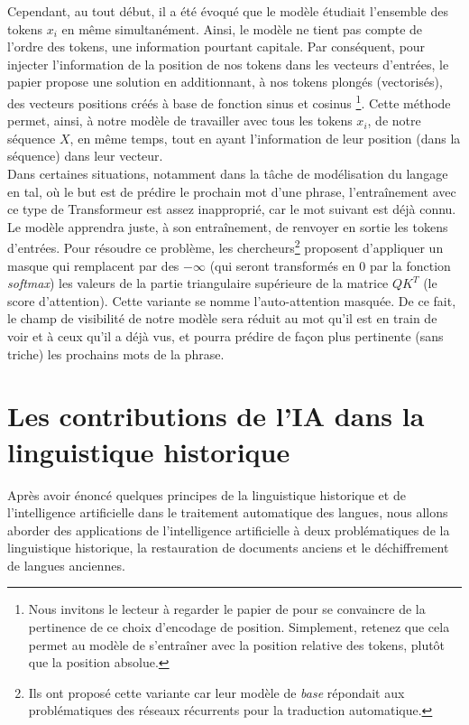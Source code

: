 \documentclass[12pt, twoside]{report}
\begin{document}
Cependant, au tout début, il a été évoqué que le modèle étudiait l'ensemble des tokens $x_i$ en même simultanément. Ainsi, le modèle ne tient pas compte de l'ordre des tokens, une information pourtant capitale. Par conséquent, pour injecter l'information de la position de nos tokens dans les vecteurs d'entrées, le papier \cite{transformer} propose une solution en additionnant, à nos tokens plongés (vectorisés), des vecteurs positions créés à base de fonction sinus et cosinus \footnote{Nous invitons le lecteur à regarder le papier de \autocite{transformer} pour se convaincre de la pertinence de ce choix d'encodage de position. Simplement, retenez que cela permet au modèle de s'entraîner avec la position relative des tokens, plutôt que la position absolue.}. Cette méthode permet, ainsi, à notre modèle de travailler avec tous les tokens $x_i$, de notre séquence $X$, en même temps, tout en ayant l'information de leur position (dans la séquence) dans leur vecteur.\\

Dans certaines situations, notamment dans la tâche de modélisation du langage en \Gls{tal}, où le but est de prédire le prochain mot d'une phrase, l'entraînement avec ce type de Transformeur est assez inapproprié, car le mot suivant est déjà connu. Le modèle apprendra juste, à son entraînement, de renvoyer en sortie les tokens d'entrées. Pour résoudre ce problème, les chercheurs\footnote{Ils ont proposé cette variante car leur modèle de \textit{base} répondait aux problématiques des réseaux récurrents pour la traduction automatique.} proposent d'appliquer un masque qui remplacent par des $-\infty$ (qui seront transformés en 0 par la fonction \textit{softmax}) les valeurs de la partie triangulaire supérieure de la matrice $QK^T$ (le score d'attention). Cette variante se nomme l'auto-attention masquée. De ce fait, le champ de visibilité de notre modèle sera réduit au mot qu'il est en train de voir et à ceux qu'il a déjà vus, et pourra prédire de façon plus pertinente (sans triche) les prochains mots de la phrase.

\chapter{Les contributions de l'IA dans la linguistique historique}

Après avoir énoncé quelques principes de la linguistique historique et de l'intelligence artificielle dans le traitement automatique des langues, nous allons aborder des applications de l'intelligence artificielle à deux problématiques de la linguistique historique, la restauration de documents anciens et le déchiffrement de langues anciennes.
\end{document}

